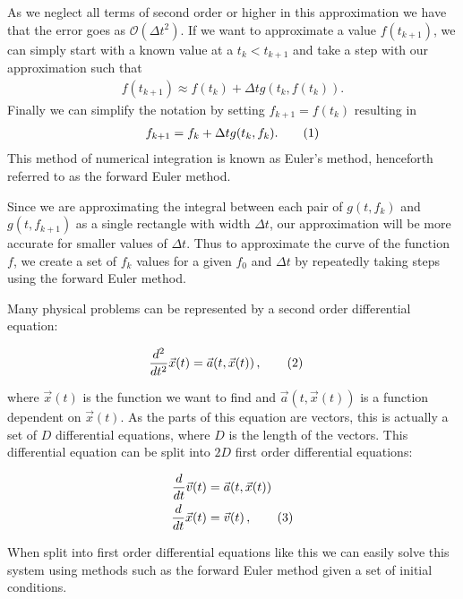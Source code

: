 \documentclass[reprint,english,notitlepage]{revtex4-1}  %
\newcommand\numberthis{\addtocounter{equation}{1}\tag{\theequation}}
\begin{document}
As we neglect all terms of second order or higher in this approximation we have that the error goes as $\mathcal{O}(\Delta t^2)$. 
If we want to approximate a value \(f(t_{k+1})\), we can simply start with a known value at a \(t_{k} < t_{k+1}\) and take a step with our approximation such that
\begin{align*}
	f(t_{k+1}) \approx f(t_{k}) + \Delta t g(t_{k}, f(t_{k})).
\end{align*}
Finally we can simplify the notation by setting \(f_{k+1} = f(t_{k})\) resulting in
\begin{align*}
	f_{k+1} = f_{k} + \Delta t g(t_{k}, f_{k}). \numberthis \label{eq:forwardEuler}
\end{align*}
This method of numerical integration is known as Euler's method, henceforth referred to as the forward Euler method.

Since we are approximating the integral between each pair of \(g(t, f_{k})\) and \(g(t, f_{k+1})\)  as a single rectangle with width \(\Delta t\), our approximation will be more accurate for smaller values of \(\Delta t\). Thus to approximate the curve of the function \(f\), we create a set of \(f_{k}\) values for a given \(f_{0}\) and \(\Delta t\) by repeatedly taking steps using the forward Euler method.

Many physical problems can be represented by a second order differential equation:

\begin{align*}
\frac{d^2}{dt^2} \vec{x}(t) &= \vec{a}(t,\vec{x}(t)) \, , \numberthis \label{eq:sodiff}
\end{align*}

where $\vec{x}(t)$ is the function we want to find and $\vec{a}(t,\vec{x}(t))$ is a function dependent on $\vec{x}(t)$. As the parts of this equation are vectors, this is actually a set of $D$ differential equations, where $D$ is the length of the vectors. This differential equation can be split into $2D$ first order differential equations:

\begin{align*}
\frac{d}{dt} \vec{v}(t) &= \vec{a}(t,\vec{x}(t))  \\
\frac{d}{dt} \vec{x}(t) &= \vec{v}(t) \, , \numberthis \label{eq:sodiff_split}
\end{align*}

When split into first order differential equations like this we can easily solve this system using methods such as the forward Euler method given a set of initial conditions. 
\end{document}
